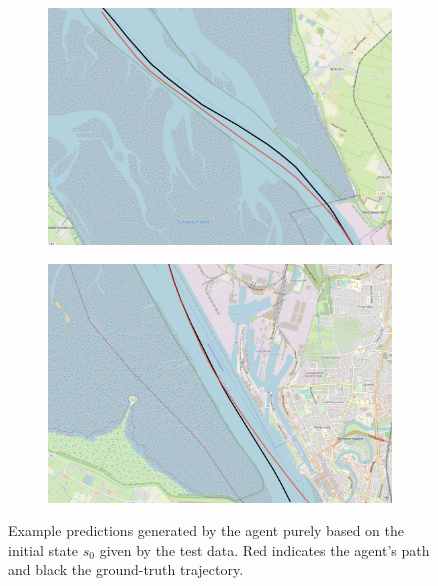 \begin{figure}[H]\ContinuedFloat
     \begin{subfigure}[b]{0.48\textwidth}
         \centering
             \includegraphics[width=\textwidth]{images/ais/tracks/pred5.png}
              \caption{}
         \label{fig:double5}
     \end{subfigure}
               \hfill
     \begin{subfigure}[b]{0.48\textwidth}
         \centering
             \includegraphics[width=\textwidth]{images/ais/tracks/pred6.png}
              \caption{}
         \label{fig:double6}
     \end{subfigure}
     \caption{Example predictions generated by the agent purely based on the initial state $s_0$ given by the test data. Red indicates the agent's path and black the ground-truth trajectory.}
     \label{fig:predictionsRL}
\end{figure}
